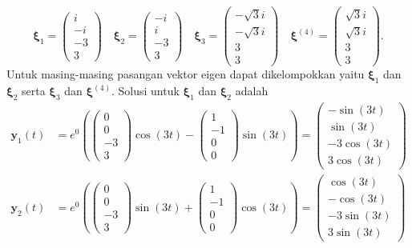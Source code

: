 \documentclass[a4paper]{article}
\theoremstyle{definisi}
\newcommand{\bfxi}{\boldsymbol{\xi}}
\numberwithin{equation}{section}
\begin{document}
\begin{enumerate}
    \[\bfxi_1 = \begin{pmatrix}i\\-i\\-3\\3\end{pmatrix} \quad \bfxi_2 = \begin{pmatrix}-i\\i\\-3\\3\end{pmatrix} \quad \bfxi_3 = \begin{pmatrix}-\sqrt{3}i\\-\sqrt{3}i\\3\\3\end{pmatrix} \quad \bfxi^{(4)} = \begin{pmatrix}\sqrt{3}i\\\sqrt{3}i\\3\\3\end{pmatrix}.\]
    Untuk masing-masing pasangan vektor eigen dapat dikelompokkan yaitu $\bfxi_1$ dan $\bfxi_2$ serta $\bfxi_3$ dan $\bfxi^{(4)}$. Solusi untuk $\bfxi_1$ dan $\bfxi_2$ adalah
    \begin{align*}
      \mathbf{y}_1(t) &= e^{0}\left(\begin{pmatrix}0\\0\\-3\\3\end{pmatrix}\cos(3t) - \begin{pmatrix}1\\-1\\0\\0\end{pmatrix}\sin(3t)\right)=\begin{pmatrix}-\sin(3t)\\\sin(3t)\\-3\cos(3t)\\3\cos(3t)\end{pmatrix}\\
      \mathbf{y}_2(t) &= e^{0}\left(\begin{pmatrix}0\\0\\-3\\3\end{pmatrix}\sin(3t) + \begin{pmatrix}1\\-1\\0\\0\end{pmatrix}\cos(3t)\right)=\begin{pmatrix}\cos(3t)\\-\cos(3t)\\-3\sin(3t)\\3\sin(3t)\end{pmatrix}

\end{align*}
\end{enumerate}
\end{document}
